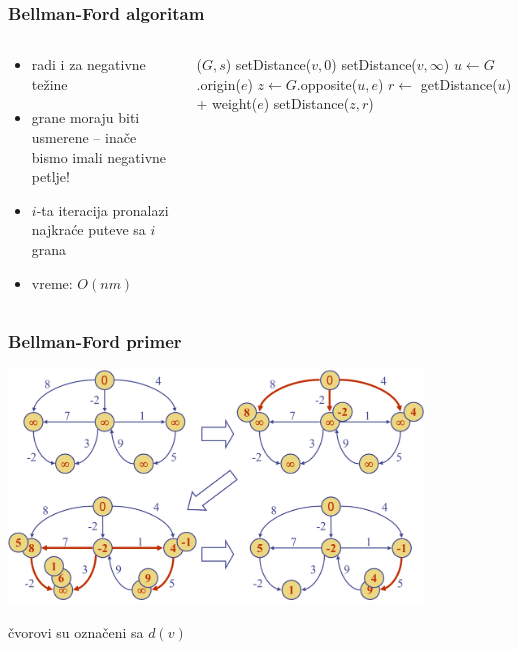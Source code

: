 \documentclass[compress]{beamer}
\begin{document}
\begin{frame}[fragile,shrink=2]
  \frametitle{Bellman-Ford algoritam}
  \begin{columns}
    \begin{column}[t]{5cm}
      \begin{itemize}
        \item radi i za negativne težine
        \item grane moraju biti usmerene -- inače bismo imali negativne 
          petlje!
        \item $i$-ta iteracija pronalazi najkraće puteve sa $i$ grana
        \item vreme: $O(nm)$
      \end{itemize}
    \end{column}
    \begin{column}[t]{7cm}
      \begin{algorithmic}
        \STATE {}($G,s$)
            \STATE setDistance($v,0$)
          \ELSE
            \STATE setDistance($v,\infty$)
          \ENDIF
        \ENDFOR
            \STATE {}
            \STATE $u \leftarrow G$.origin($e$)
            \STATE $z \leftarrow G$.opposite($u,e$)
            \STATE $r \leftarrow$ getDistance($u$) + weight($e$)
              \STATE setDistance($z,r$)
            \ENDIF
          \ENDFOR
        \ENDFOR
      \end{algorithmic}
    \end{column}
  \end{columns}
\end{frame}

\begin{frame}[fragile]
  \frametitle{Bellman-Ford primer}
  \begin{center}
    \includegraphics[width=11cm]{asp-14-pic66.png}
  \end{center}
  \hfill {\scriptsize čvorovi su označeni sa $d(v)$}
\end{frame}
\end{document}
